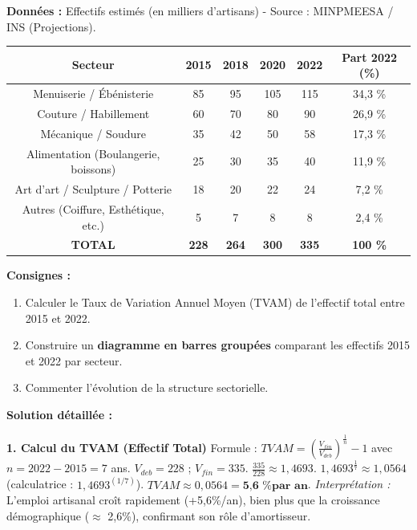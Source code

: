 \documentclass[11pt]{article}
\begin{document}
\begin{exoresolu}
\textbf{Données :} Effectifs estimés (en milliers d'artisans) - Source : MINPMEESA / INS (Projections).
\begin{center}
\begin{tabular}{|c|c|c|c|c|c|}\hline
\textbf{Secteur} & \textbf{2015} & \textbf{2018} & \textbf{2020} & \textbf{2022} & \textbf{Part 2022 (\%)} \\ \hline
Menuiserie / Ébénisterie & 85 & 95 & 105 & 115 & 34,3 \% \\ \hline
Couture / Habillement & 60 & 70 & 80 & 90 & 26,9 \% \\ \hline
Mécanique / Soudure & 35 & 42 & 50 & 58 & 17,3 \% \\ \hline
Alimentation (Boulangerie, boissons) & 25 & 30 & 35 & 40 & 11,9 \% \\ \hline
Art d'art / Sculpture / Potterie & 18 & 20 & 22 & 24 & 7,2 \% \\ \hline
Autres (Coiffure, Esthétique, etc.) & 5 & 7 & 8 & 8 & 2,4 \% \\ \hline
\textbf{TOTAL} & \textbf{228} & \textbf{264} & \textbf{300} & \textbf{335} & \textbf{100 \%} \\ \hline
\end{tabular}
\end{center}

\textbf{Consignes :}
\begin{enumerate}
    \item Calculer le Taux de Variation Annuel Moyen (TVAM) de l'effectif total entre 2015 et 2022.
    \item Construire un \textbf{diagramme en barres groupées} comparant les effectifs 2015 et 2022 par secteur.
    \item Commenter l'évolution de la structure sectorielle.
\end{enumerate}

\tcblower
\textbf{Solution détaillée :}

\textbf{1. Calcul du TVAM (Effectif Total)}
Formule : $TVAM = \left( \frac{V_{fin}}{V_{deb}} \right)^{\frac{1}{n}} - 1$ avec $n = 2022 - 2015 = 7$ ans.
$V_{deb} = 228$ ; $V_{fin} = 335$.
$\frac{335}{228} \approx 1,4693$.
$1,4693^{\frac{1}{7}} \approx 1,0564$ (calculatrice : $1,4693^{(1/7)}$).
$TVAM \approx 0,0564 = \textbf{5,6 \% par an}$.
\textit{Interprétation :} L'emploi artisanal croît rapidement (+5,6\%/an), bien plus que la croissance démographique ($\approx$ 2,6\%), confirmant son rôle d'amortisseur.


\end{exoresolu}
\end{document}
